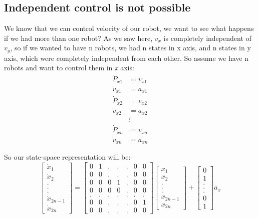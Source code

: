 \subsection{Independent control is not possible}
We know that we can control velocity of our robot, we want to see what happens if we had more than one robot? As we saw here, $v_x$ is completely independent of $v_y$, so if we wanted to have n robots, we had n states in x axis, and n states in y axis, which were completely independent from each other. So assume we have n robots and want to control them in \emph{x} axis:\\
\begin{align}
\dot{P}_{x1} &= v_{x1}\\\nonumber
\dot{v}_{x1} &= a_{x1}\\\nonumber
\dot{P}_{x2} &= v_{x2}\\\nonumber
\dot{v}_{x2} &= a_{x2}\\\nonumber
&\vdots\\\nonumber
\dot{P}_{xn} &= v_{xn}\\\nonumber
\dot{v}_{xn} &= a_{xn}\nonumber
\end{align}


So our state-space representation will be:
\begin{equation}
\begin{bmatrix}
\dot{x}_1\\ 
\dot{x}_2\\
.\\
.\\
.\\
\dot{x}_{2n-1}\\
\dot{x}_{2n}

\end{bmatrix} = \begin{bmatrix}
0 & 1 & . & . & . & 0 & 0 \\
0 & 0 & . & . & . & 0 & 0 \\
0 & 0 & 0 & 1 & . & 0 & 0 \\
0 & 0 & 0 & 0 & . & 0 & 0 \\
. & . & . & . & . & . & . \\
0 & 0 & . & . & . & 0 & 1 \\
0 & 0 & . & . & . & 0 & 0 
\end{bmatrix}  \begin{bmatrix}
x_1\\
x_2\\
.\\
.\\
.\\
x_{2n-1}\\
x_{2n}
\end{bmatrix} + \begin{bmatrix}
0\\
1\\
.\\
.\\
.\\
0\\
1
\end{bmatrix} a_x
\end{equation}

